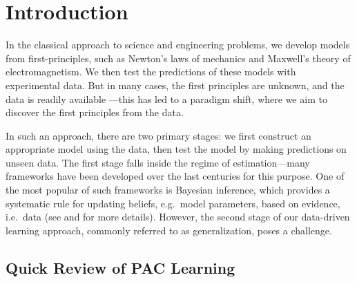 \section{Introduction}

In the classical approach to science and engineering problems, we develop models
from first-principles, such as Newton's laws of mechanics and Maxwell's theory
of electromagnetism. We then test the predictions of these models with
experimental data. But in many cases, the first principles are unknown, and the
data is readily available ---this has led to a paradigm shift, where we aim to
discover the first principles from the data.

In such an approach, there are two primary stages: we first construct an
appropriate model using the data, then test the model by making predictions on
unseen data. The first stage falls inside the regime of estimation---many
frameworks have been developed over the last centuries for this purpose. One of
the most popular of such frameworks is Bayesian inference, which provides a
systematic rule for updating beliefs, e.g.\ model parameters, based on evidence,
i.e.\ data (see \citet{bishop2006pattern} and
\citet{ghahramani2015probabilistic} for more details). However, the second stage
of our data-driven learning approach, commonly referred to as generalization,
poses a challenge.

\subsection{Quick Review of PAC Learning}

